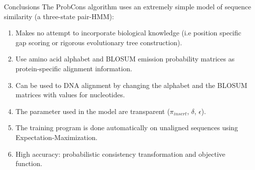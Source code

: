 \begin{frame}{Conclusions}
The ProbCons algorithm uses an extremely simple model of sequence similarity (a three-state pair-HMM):
    \begin{enumerate}
        \item Makes no attempt to incorporate biological knowledge (i.e position specific gap scoring or rigorous evolutionary tree construction).
        \item Use amino acid alphabet and BLOSUM emission probability matrices as protein-specific alignment information.
        \item Can be used to DNA alignment by changing the alphabet and the BLOSUM matrices with values for nucleotides.
        \item The parameter used in the model are transparent ($\pi_{insert}$, $\delta$, $\epsilon$).
        \item The training program is done automatically on unaligned sequences using Expectation-Maximization.
        \item High accuracy: probabilistic consistency transformation and objective function. 
    \end{enumerate}
\end{frame}